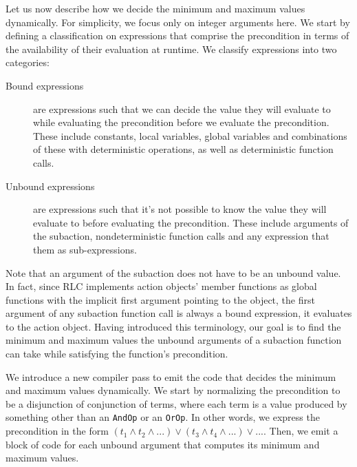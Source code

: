Let us now describe how we decide the minimum and maximum values dynamically.
For simplicity, we focus only on integer arguments here.
We start by defining a classification on expressions that comprise the precondition in terms of the availability of their evaluation at runtime.
We classify expressions into two categories:
\begin{description}
    \item [Bound expressions] are expressions such that we can decide the value they will evaluate to while evaluating the precondition before we evaluate the precondition.
These include constants, local variables, global variables and combinations of these with deterministic operations, as well as deterministic function calls.
    \item [Unbound expressions] are expressions such that it's not possible to know the value they will evaluate to before evaluating the precondition.
    These include arguments of the subaction, nondeterministic function calls and any expression that them as sub-expressions.
\end{description}

Note that an argument of the subaction does not have to be an unbound value.
In fact, since RLC implements action objects' member functions as global functions with the implicit first argument pointing to the object, the first argument of any subaction function call is always a bound expression, it evaluates to the action object.
Having introduced this terminology, our goal is to find the minimum and maximum values the unbound arguments of a subaction function can take while satisfying the function's precondition.

We introduce a new compiler pass to emit the code that decides the minimum and maximum values dynamically.
We start by normalizing the precondition to be a disjunction of conjunction of terms, where each term is a value produced by something other than an \texttt{AndOp} or an \texttt{OrOp}.
In other words, we express the precondition in the form $(t_1 \land t_2 \land ...) \lor (t_3 \land t_4 \land ...) \lor ...$.
Then, we emit a block of code for each unbound argument that computes its minimum and maximum values.

